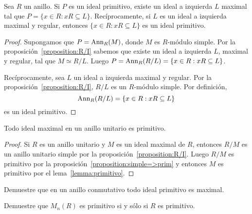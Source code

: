 \begin{lemma}
	\label{lemma:maxprim}
	Sea $R$ un anillo. Si $P$ es un ideal primitivo, existe un ideal a
	izquierda $L$ maximal tal que $P=\{x\in R:xR\subseteq L\}$.
	Recíprocamente, si $L$ es un ideal a izquierda maximal y regular, entonces
	$\{x\in R:xR\subseteq L\}$ es un ideal primitivo.
\end{lemma}

\begin{proof}
	Supongamos que $P=\operatorname{Ann}_R(M)$, donde $M$ es $R$-módulo simple. Por la
	proposición~\ref{proposition:R/I} sabemos que existe un ideal a izquierda
	$L$, maximal y regular, tal que $M\simeq R/L$. Luego $P=\operatorname{Ann}_R(R/L)=\{x\in
	R:xR\subseteq L\}$. 

	Recíprocamente, sea $L$ un ideal a izquierda maximal y regular. Por la
	proposición~\ref{proposition:R/I}, $R/L$ es un $R$-módulo simple. Por
	definición, 
	\[
	\operatorname{Ann}_R(R/L)=\{x\in R:xR\subseteq L\}
	\]
	es un ideal primitivo.
\end{proof}


\begin{proposition}
	Todo ideal maximal en un anillo unitario es primitivo. 
\end{proposition}

\begin{proof}
	Si $R$ es un anillo unitario y $M$ es un ideal maximal de $R$, entonces
	$R/M$ es un anillo unitario simple por la
	proposición~\ref{proposition:R/I}. Luego $R/M$ es primitivo por la
	proposición~\ref{proposition:simple=>prim} y entonces $M$ es primitivo por
	el lema~\ref{lemma:primitivo}. 
\end{proof}

\begin{exercise}
	Demuestre que en un anillo conmutativo todo ideal primitivo es maximal.
\end{exercise}

\begin{exercise}
	Demuestre que $M_n(R)$ es primitivo si y sólo si $R$ es primitivo.
\end{exercise}


